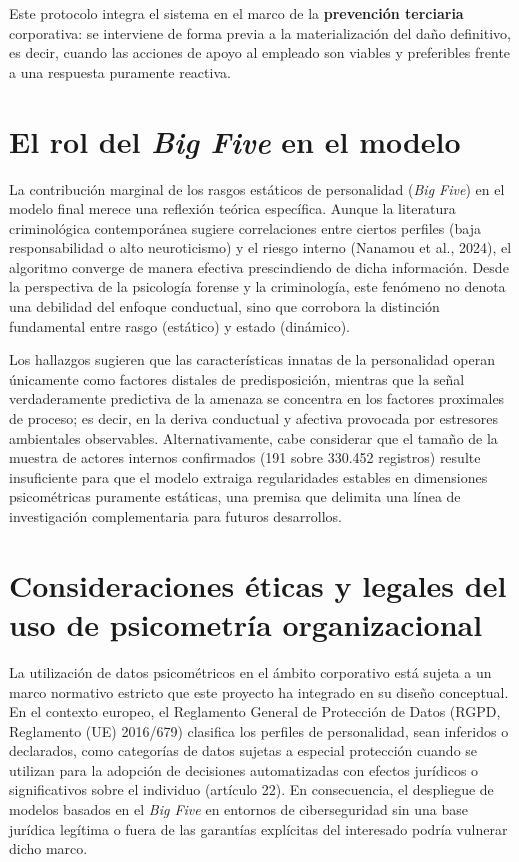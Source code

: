 \documentclass[IB]{TFUOC}%
\begin{document}
\noindent Este protocolo integra el sistema en el marco de la \textbf{prevención terciaria} corporativa: se interviene de forma previa a la materialización del daño definitivo, es decir, cuando las acciones de apoyo al empleado son viables y preferibles frente a una respuesta puramente reactiva.


\section{El rol del \textit{Big Five} en el modelo}
La contribución marginal de los rasgos estáticos de personalidad (\textit{Big Five}) en el modelo final merece una reflexión teórica específica. Aunque la literatura criminológica contemporánea sugiere correlaciones entre ciertos perfiles (baja responsabilidad o alto neuroticismo) y el riesgo interno (Nanamou et al., 2024), el algoritmo converge de manera efectiva prescindiendo de dicha información. Desde la perspectiva de la psicología forense y la criminología, este fenómeno no denota una debilidad del enfoque conductual, sino que corrobora la distinción fundamental entre rasgo (estático) y estado (dinámico). 

\medskip
\noindent Los hallazgos sugieren que las características innatas de la personalidad operan únicamente como factores distales de predisposición, mientras que la señal verdaderamente predictiva de la amenaza se concentra en los factores proximales de proceso; es decir, en la deriva conductual y afectiva provocada por estresores ambientales observables. Alternativamente, cabe considerar que el tamaño de la muestra de actores internos confirmados (191 sobre 330.452 registros) resulte insuficiente para que el modelo extraiga regularidades estables en dimensiones psicométricas puramente estáticas, una premisa que delimita una línea de investigación complementaria para futuros desarrollos.

\section{Consideraciones éticas y legales del uso de psicometría organizacional}

La utilización de datos psicométricos en el ámbito corporativo está sujeta a un marco normativo estricto que este proyecto ha integrado en su diseño conceptual. En el contexto europeo, el Reglamento General de Protección de Datos (RGPD, Reglamento (UE) 2016/679) clasifica los perfiles de personalidad, sean inferidos o declarados, como categorías de datos sujetas a especial protección cuando se utilizan para la adopción de decisiones automatizadas con efectos jurídicos o significativos sobre el individuo (artículo 22). En consecuencia, el despliegue de modelos basados en el \textit{Big Five} en entornos de ciberseguridad sin una base jurídica legítima o fuera de las garantías explícitas del interesado podría vulnerar dicho marco.
\end{document}

